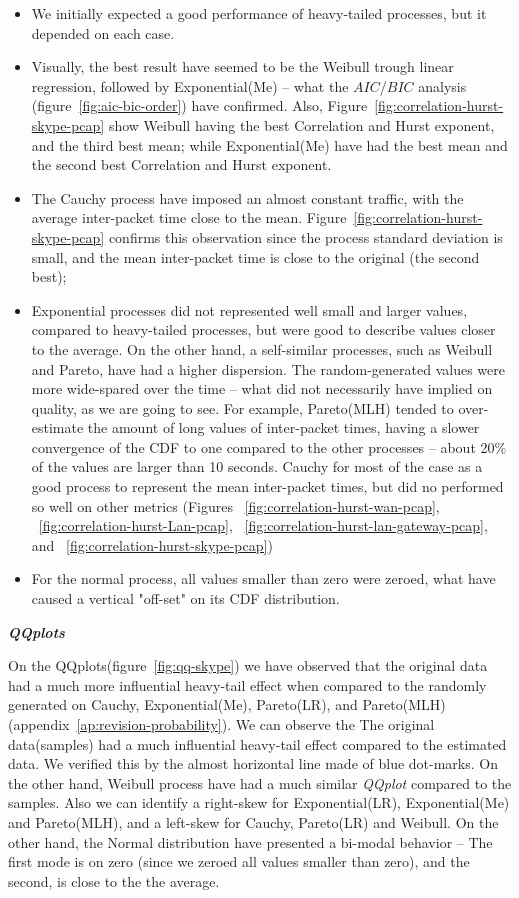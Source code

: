 \begin{itemize}
    \item We initially expected a good performance of heavy-tailed processes, but it depended on each case.
    \item Visually, the best result have seemed to be
    the Weibull trough linear regression, followed by Exponential(Me) -- what the $AIC$/$BIC$ analysis (figure~\ref{fig:aic-bic-order}) have confirmed. Also, Figure~\ref{fig:correlation-hurst-skype-pcap} show Weibull having the best Correlation and Hurst exponent, and the third best mean; while Exponential(Me) have had the best mean and the second best Correlation and Hurst exponent. 
    \item The Cauchy process have imposed an almost constant traffic, with the average inter-packet time close to the mean. Figure~\ref{fig:correlation-hurst-skype-pcap} confirms this observation since the process standard deviation is small, and the mean inter-packet time is close to the original (the second best);
    \item Exponential processes did not represented well small and larger values, compared to heavy-tailed processes, but were good to describe values closer to the average. On the other hand, a self-similar processes, such as Weibull and Pareto, have had a higher dispersion. The random-generated values were more wide-spared over the time -- what did not necessarily have implied on quality, as we are going to see. For example, Pareto(MLH) tended to over-estimate the amount of long values of inter-packet times, having a slower convergence of the CDF to one compared to the other processes -- about 20\% of the values are larger than 10 seconds. Cauchy for most of the case as a good process to represent the mean inter-packet times, but did no performed so well on other metrics (Figures      ~\ref{fig:correlation-hurst-wan-pcap}, ~\ref{fig:correlation-hurst-Lan-pcap}, ~\ref{fig:correlation-hurst-lan-gateway-pcap}, and  ~\ref{fig:correlation-hurst-skype-pcap})
    \item For the normal process, all values smaller than zero were zeroed, what have caused a vertical "off-set" on its CDF distribution. 
\end{itemize}

\smallskip  \noindent  \textbf{\textit{QQplots}}

On the QQplots(figure~\ref{fig:qq-skype}) we have observed that the original data had a much more influential heavy-tail effect when compared to the randomly generated on Cauchy, Exponential(Me), Pareto(LR), and Pareto(MLH) (appendix~\ref{ap:revision-probability}). We can observe  the The original data(samples) had a much influential heavy-tail effect compared to  the estimated data. We  verified this by the almost horizontal line made of blue dot-marks. On the other hand, Weibull process have had a much similar \textit{QQplot} compared to the samples.
Also we can identify a right-skew for Exponential(LR), Exponential(Me) and Pareto(MLH), and a left-skew for Cauchy, Pareto(LR) and Weibull.  On the other hand, the Normal distribution have presented a bi-modal behavior -- The first mode is on zero (since we zeroed all values smaller than zero), and the second, is close to the the average.


